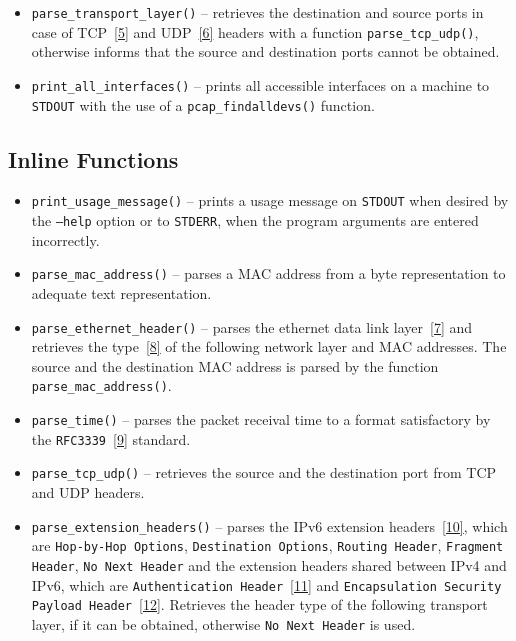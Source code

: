 \documentclass[12pt]{article}
\begin{document}
\begin{itemize}
		\item \texttt{parse\_transport\_layer()} -- retrieves the destination and source ports in case of TCP~\hyperref[cit5]{[5]} and UDP~\hyperref[cit6]{[6]} headers with a function \texttt{parse\_tcp\_udp()}, otherwise informs that the source and destination ports cannot be obtained. 
		\item \texttt{print\_all\_interfaces()} -- prints all accessible interfaces on a machine to \texttt{STDOUT} with the use of a \texttt{pcap\_findalldevs()} function.
\end{itemize}

\subsection{Inline Functions}
\begin{itemize}
	\item \texttt{print\_usage\_message()} -- prints a usage message on \texttt{STDOUT} when desired by the \texttt{--help} option or to \texttt{STDERR}, when the program arguments are entered incorrectly.
	\item \texttt{parse\_mac\_address()} -- parses a MAC address from a byte representation to adequate text representation.
	\item \texttt{parse\_ethernet\_header()} -- parses the ethernet data link layer~\hyperref[cit7]{[7]} and retrieves the type~\hyperref[cit8]{[8]} of the following network layer and MAC addresses. The source and the destination MAC address is parsed by the function \texttt{parse\_mac\_address()}.
	\item \texttt{parse\_time()} -- parses the packet receival time to a format satisfactory by the \texttt{RFC3339}~\hyperref[cit9]{[9]} standard.
	\item \texttt{parse\_tcp\_udp()} -- retrieves the source and the destination port from TCP and UDP headers.
	\item \texttt{parse\_extension\_headers()} -- parses the IPv6 extension headers~\hyperref[cit10]{[10]}, which are \texttt{Hop-by-Hop Options}, \texttt{Destination Options}, \texttt{Routing Header}, \texttt{Fragment Header}, \texttt{No Next Header} and the extension headers shared between IPv4 and IPv6, which are \texttt{Authentication Header}~\hyperref[cit11]{[11]} and  \texttt{Encapsulation Security Payload Header}~\hyperref[cit12]{[12]}. Retrieves the header type of the following transport layer, if it can be obtained, otherwise \texttt{No Next Header} is used.
\end{itemize}
\end{document}
